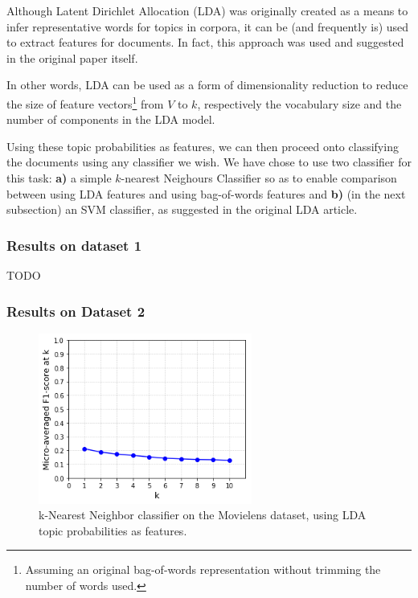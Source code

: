 Although Latent Dirichlet Allocation (LDA) \citep{blei_etal_2003} was originally created as a means to infer representative words for topics in corpora, it can be (and frequently is) used to extract features for documents. In fact, this approach was used and suggested in the original paper itself.

In other words, LDA can be used as a form of dimensionality reduction to reduce the size of feature vectors\footnote{Assuming an original bag-of-words representation without trimming the number of words used.} from $V$ to $k$, respectively the vocabulary size and the number of components in the LDA model.

Using these topic probabilities as features, we can then proceed onto classifying the documents using any classifier we wish. We have chose to use two classifier for this task: \textbf{a)} a simple $k$-nearest Neighours Classifier so as to enable comparison between using LDA features and using bag-of-words features and \textbf{b)} (in the next subsection) an SVM classifier, as suggested in the original LDA article.

\subsubsection{Results on dataset 1}

{\color{red} TODO}

\subsubsection{Results on Dataset 2}

\begin{figure}[H]
    \centering
    \includegraphics[width=7cm]{chapters/05_experiments/images/knn-lda-movielens.png}
    \caption{k-Nearest Neighbor classifier on the Movielens dataset, using LDA topic probabilities as features.}
    \label{fig:knn_lda_movielens}
\end{figure}

